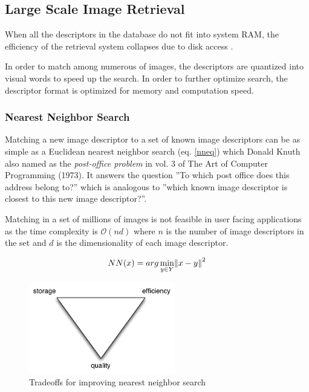 \documentclass[english,12pt,a4paper,pdftex,elec,utf8, table]{aaltothesis}
\begin{document}
\subsection{Large Scale Image Retrieval}

When all the descriptors in the database do not fit into system RAM, the efficiency of the retrieval system collapses due to disk access \cite{Philbin2007}.

In order to match among numerous of images, the descriptors are quantized into visual words to speed up the search. In order to further optimize search, the descriptor format is optimized for memory and computation speed. \cite{Jegou2010}

\subsubsection{Nearest Neighbor Search}
Matching a new image descriptor to a set of known image descriptors can be as simple as a Euclidean nearest neighbor search (eq. \ref{nneq}) which Donald Knuth also named as the \emph{post-office problem} in vol. 3 of The Art of Computer Programming (1973). It answers the question ''To which post office does this address belong to?'' which is analogous to ''which known image descriptor is closest to this new image descriptor?''.

Matching in a set of millions of images is not feasible in user facing applications as the time complexity is $\mathcal{O}(nd)$ where $n$ is the number of image descriptors in the set and $d$ is the dimensionality of each image descriptor.


\begin{equation}
\label{nneq}
NN(x) = arg \min_{y\in Y}\norm{x-y}^2
\end{equation}

\begin{figure}[htb]
\begin{center}
\includegraphics[height=4cm]{figures/nntradeoffs}
\end{center}
\caption{Tradeoffs for improving nearest neighbor search}
\label{nntradeoffs}
\end{figure}
\end{document}

